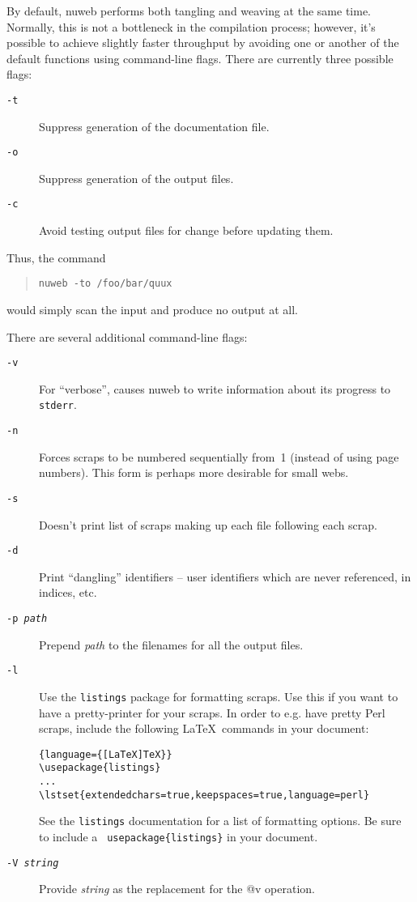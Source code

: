 \documentclass[a4paper]{report}
\begin{document}
By default, nuweb performs both tangling and weaving at the same time.
Normally, this is not a bottleneck in the compilation process;
however, it's possible to achieve slightly faster throughput by
avoiding one or another of the default functions using command-line
flags. There are currently three possible flags:
\begin{description}
\item[\tt -t] Suppress generation of the documentation file.
\item[\tt -o] Suppress generation of the output files.
\item[\tt -c] Avoid testing output files for change before updating them.
\end{description}
Thus, the command
\begin{quote}
\verb|nuweb -to /foo/bar/quux|
\end{quote}
would simply scan the input and produce no output at all.

There are several additional command-line flags:
\begin{description}
\item[\tt -v] For ``verbose'', causes nuweb to write information about
  its progress to \verb|stderr|.
\item[\tt -n] Forces scraps to be numbered sequentially from~1
  (instead of using page numbers). This form is perhaps more desirable
  for small webs.
\item[\tt -s] Doesn't print list of scraps making up each file
  following each scrap.
\item[\tt -d] Print ``dangling'' identifiers -- user identifiers which
  are never referenced, in indices, etc.
\item[\tt -p {\it path}] Prepend \textit{path} to the filenames for
all the output files.
\item[\tt -l] \label{sec:pretty-print} Use the \texttt{listings}
package for formatting scraps. Use this if you want to have a
pretty-printer for your scraps. In order to e.g. have pretty Perl
scraps, include the following \LaTeX\ commands in your document:
\lstset{language=[LaTeX]TeX}

\begin{lstlisting}{language={[LaTeX]TeX}}
\usepackage{listings}
...
\lstset{extendedchars=true,keepspaces=true,language=perl}
\end{lstlisting}

See the \texttt{listings} documentation for a list of formatting
options. Be sure to include a \texttt{
usepackage\{listings\}}
in your document.

\item[\tt -V \it string] Provide \textit{string} as the
replacement for the @v operation.
\end{description}
\end{document}
